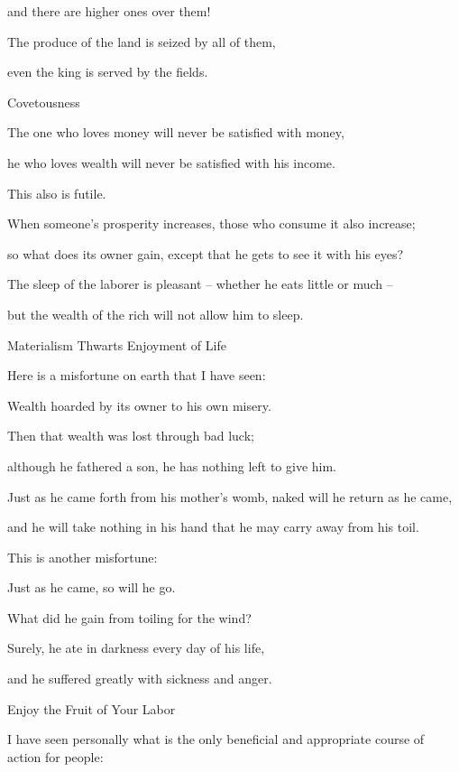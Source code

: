 {\par }{\Q and there are higher
ones over them!
\par }{\Q {}The produce
of the land
is seized by all
of them,
\par }{\Q even the king
is served
by the fields.
\par }{\SH Covetousness
\par }{\Q {}The one who loves
money
will never
be satisfied
with money,
\par }{\Q he who
loves
wealth
will never
be satisfied with his income.
\par }{\Q This
also
is futile.
\par }{\Q {}When someone’s prosperity
increases,
those who consume
it also increase;
\par }{\Q so what
does its owner
gain,
except
that
he gets to see
it with his eyes?
\par }{\Q {}The sleep
of the laborer
is pleasant
– whether
he eats
little
or much
–
\par }{\Q but the wealth
of the rich
will not
allow
him to sleep.
\par }{\SH Materialism Thwarts Enjoyment of Life
\par }{\Q {}Here is
a misfortune
on earth
that I have seen:
\par }{\Q Wealth
hoarded
by its owner
to his own misery.
\par }{\Q {}Then that
wealth
was lost
through bad
luck;
\par }{\Q although he fathered
a son,
he has nothing left to give him.
\par }{\Q {}Just
as he came forth
from his mother's
womb,
naked
will he return
as he came,
\par }{\Q and he will take nothing
in his hand
that he may carry
away from his toil.
\par }{\Q {}This
is another
misfortune:

\par }{\Q Just
as
he came,
so
will he go.
\par }{\Q What
did he gain from toiling
for
the wind?
\par }{\Q {}Surely,
he ate
in darkness
every
day
of his life,
\par }{\Q and he suffered
greatly
with sickness
and anger.
\par }{\SH Enjoy the Fruit of Your Labor
\par }{\Q {}I
have seen
personally what
is the only beneficial
and
appropriate
course of action for people:

}
